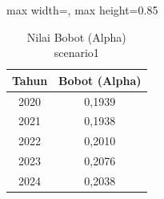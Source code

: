 \begin{table}[H]
\centering
\caption{Nilai Bobot (Alpha) scenario1} \label{tab:app1alpha}
\begin{adjustbox}{max width=\textwidth, max height=0.85\textheight}
\begin{tabular}{|c|c|}
\hline
\textbf{Tahun} & \textbf{Bobot (Alpha)} \\
\hline
2020 & 0,1939 \\
2021 & 0,1938 \\
2022 & 0,2010 \\
2023 & 0,2076 \\
2024 & 0,2038 \\
\hline
\end{tabular}
\end{adjustbox}
\end{table}